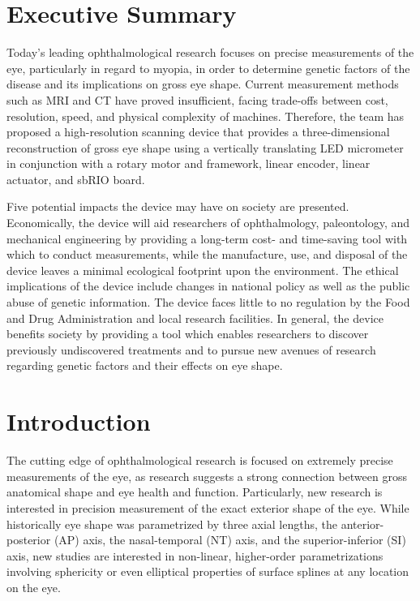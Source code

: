 \documentclass{article}
\begin{document}
 
 
\setcounter{tocdepth}{2}
\tableofcontents
\newpage
 
 
\section*{Executive Summary}
\label{sec:exec-summary}
 
Today's leading ophthalmological research focuses on precise
measurements of the eye, particularly in regard to myopia, in order to
determine genetic factors of the disease and its implications on gross
eye shape. Current measurement methods such as MRI and CT have proved
insufficient, facing trade-offs between cost, resolution, speed, and
physical complexity of machines. Therefore, the team has proposed a
high-resolution scanning device that provides a three-dimensional
reconstruction of gross eye shape using a vertically translating LED
micrometer in conjunction with a rotary motor and framework, linear
encoder, linear actuator, and sbRIO board.

Five potential impacts the device may have on society are
presented. Economically, the device will aid researchers of
ophthalmology, paleontology, and mechanical engineering by providing a
long-term cost- and time-saving tool with which to conduct
measurements, while the manufacture, use, and disposal of the device
leaves a minimal ecological footprint upon the environment. The
ethical implications of the device include changes in national policy
as well as the public abuse of genetic information. The device faces
little to no regulation by the Food and Drug Administration and local
research facilities. In general, the device benefits society by
providing a tool which enables researchers to discover previously
undiscovered treatments and to pursue new avenues of research
regarding genetic factors and their effects on eye shape.


\newpage
 
  
\section{Introduction}
\label{sec:Introduction}
 
The cutting edge of ophthalmological research is focused on extremely
precise measurements of the eye, as research suggests a strong
connection between gross anatomical shape and eye health and
function. Particularly, new research is interested in precision
measurement of the exact exterior shape of the
eye\cite{atchison04,zhou99:genes,zhou99:models,guggenheim04,wallman04}. While
historically eye shape was parametrized by three axial lengths, the
anterior-posterior (AP) axis, the nasal-temporal (NT) axis, and the
superior-inferior (SI) axis, new studies are interested in non-linear,
higher-order parametrizations involving sphericity or even elliptical
properties of surface splines at any location on the eye.
 
\end{document}
